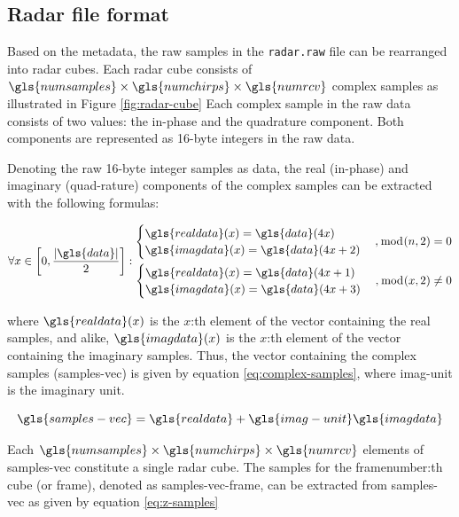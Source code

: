 \subsection{Radar file format}
\label{sec:radar-data}

Based on the metadata, the raw samples in the \texttt{radar.raw} file can be rearranged into radar cubes.
Each radar cube consists of $\gls{numsamples} \times \gls{numchirps} \times \gls{numrcv}$ complex samples as illustrated in Figure \ref{fig:radar-cube}
Each complex sample in the raw data consists of two values: the in-phase and the quadrature component.
Both components are represented as 16-byte integers in the raw data.

Denoting the raw 16-byte integer samples as \gls{data}, the real (in-phase) and imaginary (quad-rature) components
of the complex samples can be extracted with the following formulas:

\begin{equation}
    \forall x \in \left[ 0, \frac{| \gls{data} |}{2} \right] : \begin{split}
        \begin{cases}
            \gls{realdata}(x) = \gls{data} (4x) \\
            \gls{imagdata}(x) = \gls{data} (4x+2)
        \end{cases} ,\bmod(n, 2) = 0 \\
        \begin{cases}
            \gls{realdata}(x) = \gls{data} (4x+1) \\
            \gls{imagdata}(x) = \gls{data} (4x+3)
        \end{cases} ,\bmod(x, 2) \neq 0
    \end{split}
\end{equation}

where $\gls{realdata}(x)$ is the $x$:th element of the vector containing the real samples,
and alike, $\gls{imagdata}(x)$ is the $x$:th element of the vector containing the imaginary samples.
Thus, the vector containing the complex samples (\gls{samples-vec}) is given by equation \ref{eq:complex-samples}, where \gls{imag-unit} is the imaginary unit.

\begin{equation}
    \label{eq:complex-samples}
    \gls{samples-vec} = \gls{realdata} + \gls{imag-unit} \gls{imagdata}
\end{equation}

Each $\gls{numsamples} \times \gls{numchirps} \times \gls{numrcv}$ elements of \gls{samples-vec} constitute a single radar cube.
The samples for the \gls{framenumber}:th cube (or frame), denoted as \gls{samples-vec-frame}, can be extracted from \gls{samples-vec} as given by equation \ref{eq:z-samples} 

